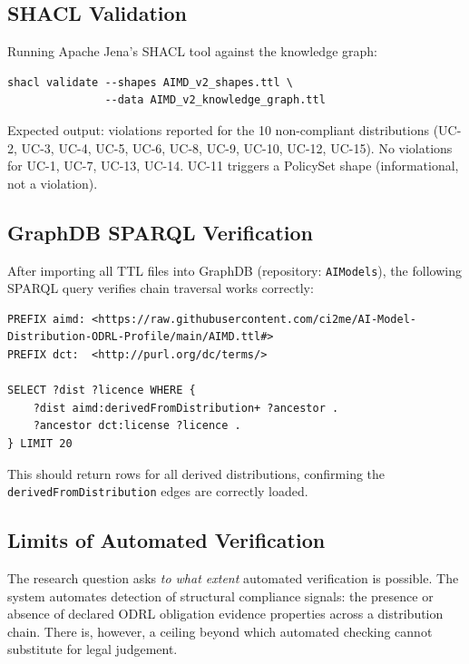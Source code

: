 \documentclass[12pt,a4paper]{article}
\begin{document}
\subsection{SHACL Validation}

Running Apache Jena's SHACL tool against the knowledge graph:

\begin{lstlisting}[language={}]
shacl validate --shapes AIMD_v2_shapes.ttl \
               --data AIMD_v2_knowledge_graph.ttl
\end{lstlisting}

Expected output: violations reported for the 10 non-compliant distributions (UC-2, UC-3, UC-4, UC-5, UC-6, UC-8, UC-9, UC-10, UC-12, UC-15). No violations for UC-1, UC-7, UC-13, UC-14. UC-11 triggers a PolicySet shape (informational, not a violation).

\subsection{GraphDB SPARQL Verification}

After importing all TTL files into GraphDB (repository: \texttt{AIModels}), the following SPARQL query verifies chain traversal works correctly:

\begin{lstlisting}
PREFIX aimd: <https://raw.githubusercontent.com/ci2me/AI-Model-Distribution-ODRL-Profile/main/AIMD.ttl#>
PREFIX dct:  <http://purl.org/dc/terms/>

SELECT ?dist ?licence WHERE {
    ?dist aimd:derivedFromDistribution+ ?ancestor .
    ?ancestor dct:license ?licence .
} LIMIT 20
\end{lstlisting}

This should return rows for all derived distributions, confirming the \texttt{derivedFromDistribution} edges are correctly loaded.

\subsection{Limits of Automated Verification}

The research question asks \textit{to what extent} automated verification is possible. The system automates detection of structural compliance signals: the presence or absence of declared ODRL obligation evidence properties across a distribution chain. There is, however, a ceiling beyond which automated checking cannot substitute for legal judgement.
\end{document}
